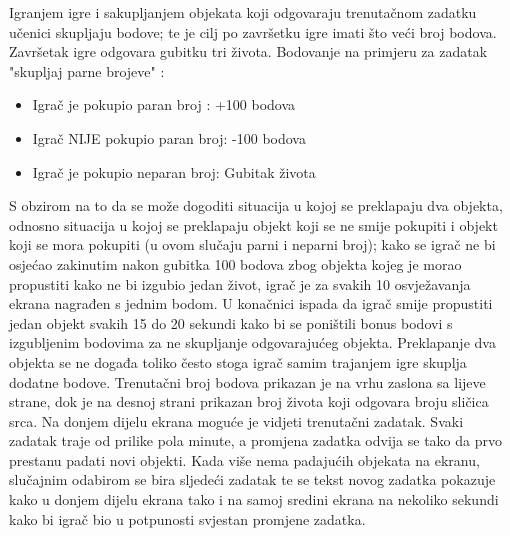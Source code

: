 \documentclass[times, utf8, zavrsni, numeric]{fer}
\begin{document}
		Igranjem igre i sakupljanjem objekata koji odgovaraju trenutačnom zadatku učenici skupljaju bodove; te je cilj po završetku igre imati što veći broj bodova. Završetak igre odgovara gubitku tri života.
		Bodovanje na primjeru  za zadatak "skupljaj parne brojeve" :
		\begin{itemize}
				\item  {Igrač je pokupio paran broj : +100 bodova}
				\item  {Igrač NIJE pokupio paran broj: -100 bodova}
				\item  {Igrač je pokupio neparan broj: Gubitak života}
		\end{itemize}
		
		S obzirom na to da se može dogoditi situacija u kojoj se preklapaju dva objekta, odnosno situacija u kojoj se preklapaju objekt koji se ne smije pokupiti i objekt koji se mora pokupiti (u ovom slučaju parni i neparni broj); kako se igrač ne bi osjećao
		zakinutim nakon gubitka 100 bodova zbog objekta kojeg je morao propustiti kako ne bi izgubio jedan život, igrač je za svakih 10 osvježavanja ekrana nagrađen s jednim bodom. U konačnici ispada da igrač smije propustiti jedan objekt svakih 15 do 20 sekundi
		kako bi se poništili bonus bodovi s izgubljenim bodovima za ne skupljanje odgovarajućeg objekta. Preklapanje dva objekta se ne događa toliko često stoga igrač samim trajanjem igre skuplja dodatne bodove.
		\newline
		Trenutačni broj bodova prikazan je na vrhu zaslona sa lijeve strane, dok je na desnoj strani prikazan broj života koji odgovara broju sličica srca. Na donjem dijelu ekrana moguće je vidjeti trenutačni zadatak.
		Svaki zadatak traje od prilike pola minute, a promjena zadatka odvija se tako da prvo prestanu padati novi objekti. Kada više nema padajućih objekata na ekranu, slučajnim odabirom se bira sljedeći zadatak te se tekst novog zadatka
		pokazuje kako u donjem dijelu ekrana tako i na samoj sredini ekrana na nekoliko sekundi kako bi igrač bio u potpunosti svjestan promjene zadatka. 

		
\end{document}

